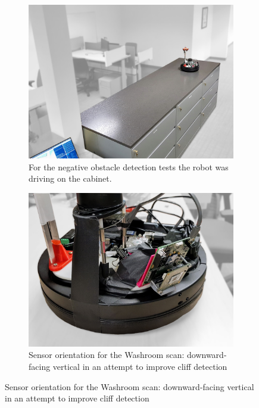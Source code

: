 \begin{figure}[htbp]
    \centering
    \begin{subfigure}[t]{.475\textwidth}
        \includegraphics[width=\textwidth]{gfx/pictures/cliff}
        \caption{For the negative obstacle detection tests the robot was driving on the cabinet.}
        \label{fig:cliff}
    \end{subfigure}%
    \hfill%
    \begin{subfigure}[t]{.475\textwidth}
        \includegraphics[width=\textwidth]{gfx/pictures/cliff_sensor}
        \caption{Sensor orientation for the Washroom scan: downward-facing vertical in an attempt to improve cliff detection}
        \label{fig:cliff_sensor}
    \end{subfigure}
\end{figure}

